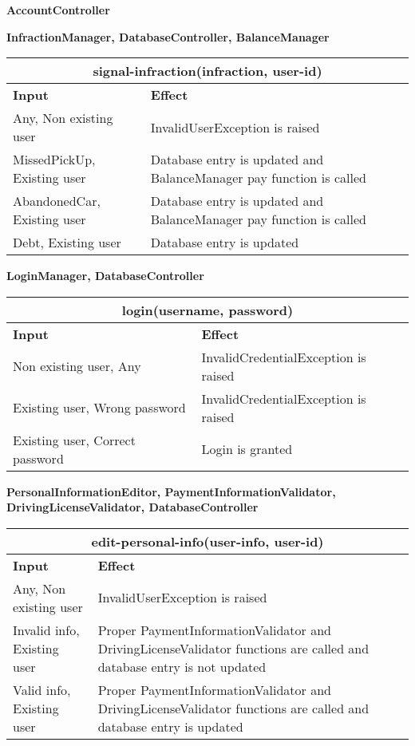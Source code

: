 \begin{Large}
\textbf{AccountController}
\end{Large}

\textbf{InfractionManager, DatabaseController, BalanceManager} \\
\begin{tabular}{|p{5cm}|p{7cm}|}
\hline
\multicolumn{2}{|c|}{signal-infraction(infraction, user-id)} \\
\hline
\textbf{Input} & \textbf{Effect} \\

\hline
Any, Non existing user & InvalidUserException is raised \\

\hline
MissedPickUp, Existing user & Database entry is updated and BalanceManager pay function is called \\

\hline
AbandonedCar, Existing user & Database entry is updated and BalanceManager pay function is called \\

\hline
Debt, Existing user & Database entry is updated \\
\hline
\end{tabular}

\textbf{LoginManager, DatabaseController} \\
\begin{tabular}{|p{5cm}|p{7cm}|}
\hline
\multicolumn{2}{|c|}{login(username, password)} \\
\hline
\textbf{Input} & \textbf{Effect} \\

\hline
Non existing user, Any & InvalidCredentialException is raised \\

\hline
Existing user, Wrong password & InvalidCredentialException is raised \\

\hline
Existing user, Correct password & Login is granted \\
\hline
\end{tabular}

\textbf{PersonalInformationEditor, PaymentInformationValidator, DrivingLicenseValidator, DatabaseController} \\
\begin{tabular}{|p{5cm}|p{7cm}|}
\hline
\multicolumn{2}{|c|}{edit-personal-info(user-info, user-id)} \\
\hline
\textbf{Input} & \textbf{Effect} \\

\hline
Any, Non existing user & InvalidUserException is raised \\

\hline
Invalid info, Existing user & Proper PaymentInformationValidator and DrivingLicenseValidator functions are called and database entry is not updated \\

\hline
Valid info, Existing user & Proper PaymentInformationValidator and DrivingLicenseValidator functions are called and database entry is updated \\
\hline
\end{tabular}


